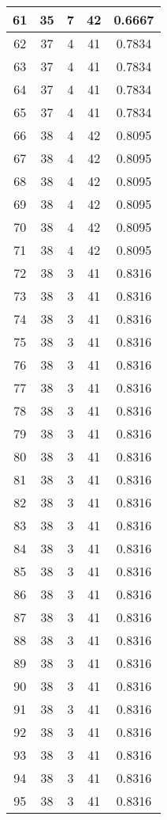 \documentclass[letterpaper, 12pt]{article}
\begin{document}
\begin{longtable}{|c|c|c|c|c|}
\hline
61 & 35 & 7 & 42 & 0.6667 \\
\hline
62 & 37 & 4 & 41 & 0.7834 \\
\hline
63 & 37 & 4 & 41 & 0.7834 \\
\hline
64 & 37 & 4 & 41 & 0.7834 \\
\hline
65 & 37 & 4 & 41 & 0.7834 \\
\hline
66 & 38 & 4 & 42 & 0.8095 \\
\hline
67 & 38 & 4 & 42 & 0.8095 \\
\hline
68 & 38 & 4 & 42 & 0.8095 \\
\hline
69 & 38 & 4 & 42 & 0.8095 \\
\hline
70 & 38 & 4 & 42 & 0.8095 \\
\hline
71 & 38 & 4 & 42 & 0.8095 \\
\hline
72 & 38 & 3 & 41 & 0.8316 \\
\hline
73 & 38 & 3 & 41 & 0.8316 \\
\hline
74 & 38 & 3 & 41 & 0.8316 \\
\hline
75 & 38 & 3 & 41 & 0.8316 \\
\hline
76 & 38 & 3 & 41 & 0.8316 \\
\hline
77 & 38 & 3 & 41 & 0.8316 \\
\hline
78 & 38 & 3 & 41 & 0.8316 \\
\hline
79 & 38 & 3 & 41 & 0.8316 \\
\hline
80 & 38 & 3 & 41 & 0.8316 \\
\hline
81 & 38 & 3 & 41 & 0.8316 \\
\hline
82 & 38 & 3 & 41 & 0.8316 \\
\hline
83 & 38 & 3 & 41 & 0.8316 \\
\hline
84 & 38 & 3 & 41 & 0.8316 \\
\hline
85 & 38 & 3 & 41 & 0.8316 \\
\hline
86 & 38 & 3 & 41 & 0.8316 \\
\hline
87 & 38 & 3 & 41 & 0.8316 \\
\hline
88 & 38 & 3 & 41 & 0.8316 \\
\hline
89 & 38 & 3 & 41 & 0.8316 \\
\hline
90 & 38 & 3 & 41 & 0.8316 \\
\hline
91 & 38 & 3 & 41 & 0.8316 \\
\hline
92 & 38 & 3 & 41 & 0.8316 \\
\hline
93 & 38 & 3 & 41 & 0.8316 \\
\hline
94 & 38 & 3 & 41 & 0.8316 \\
\hline
95 & 38 & 3 & 41 & 0.8316 \\

\end{longtable}
\end{document}
